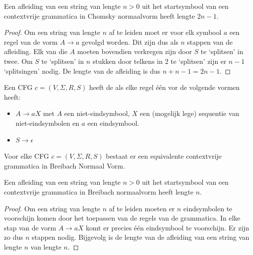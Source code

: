 \documentclass[main.tex]{subfiles}
\begin{document}
\begin{st}
  \label{st:chomsky-normaalvorm-afleidingslengte}
  Een afleiding van een string van lengte $n>0$ uit het startsymbool van een contextvrije grammatica in Chomsky normaalvorm heeft lengte $2n-1$.
  \begin{proof}
    Om een string van lengte $n$ af te leiden moet er voor elk symbool $a$ een regel van de vorm $A \rightarrow a$ gevolgd worden.
    Dit zijn dus als $n$ stappen van de afleiding.
    Elk van die $A$ moeten bovendien verkregen zijn door $S$ te `splitsen' in twee.
    Om $S$ te `splitsen' in $n$ stukken door telkens in $2$ te `splitsen' zijn er $n-1$ `splitsingen' nodig.
    De lengte van de afleiding is dus $n + n - 1 = 2n-1$.
  \end{proof}
\end{st}

\begin{de}
  Een CFG $c = (V,\Sigma,R,S)$ heeft de  als elke regel \'e\'en vor de volgende vormen heeft:
  \begin{itemize}
  \item $A \rightarrow aX$ met $A$ een niet-eindsymbool, $X$ een (mogelijk lege) sequentie van niet-eindsymbolen en $a$ een eindsymbool.
  \item $S \rightarrow \epsilon$
  \end{itemize}
\end{de}

\begin{st}
  Voor elke CFG $c = (V,\Sigma,R,S)$ bestaat er een equivalente contextvrije grammatica in Breibach Normaal Vorm.
 
\end{st}

\begin{st}
  Een afleiding van een string van lengte $n>0$ uit het startsymbool van een contextvrije grammatica in Breibach normaalvorm heeft lengte $n$.
 
  \begin{proof}
    Om een string van lengte $n$ af te leiden moeten er $n$ eindsymbolen te voorschijn komen door het toepassen van de regels van de grammatica.
    In elke stap van de vorm $A \rightarrow aX$ komt er precies \'e\'en eindsymbool te voorschijn.
    Er zijn zo dus $n$ stappen nodig. Bijgevolg is de lengte van de afleiding van een string van lengte $n$ van lengte $n$.
  \end{proof}
\end{st}
\end{document}
